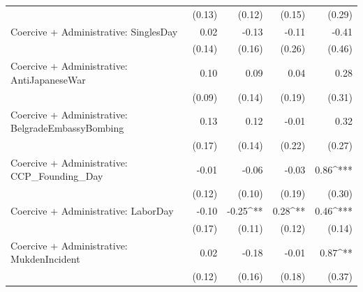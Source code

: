 \begin{table}
\begin{center}
\begin{tabular}{l D{.}{.}{6.5} D{.}{.}{6.5} D{.}{.}{6.5} D{.}{.}{6.5}}
                                                     & (0.13)                  & (0.12)                  & (0.15)                  & (0.29)                  \\
Coercive + Administrative: SinglesDay                & 0.02                    & -0.13                   & -0.11                   & -0.41                   \\
                                                     & (0.14)                  & (0.16)                  & (0.26)                  & (0.46)                  \\
Coercive + Administrative: AntiJapaneseWar           & 0.10                    & 0.09                    & 0.04                    & 0.28                    \\
                                                     & (0.09)                  & (0.14)                  & (0.19)                  & (0.31)                  \\
Coercive + Administrative: BelgradeEmbassyBombing    & 0.13                    & 0.12                    & -0.01                   & 0.32                    \\
                                                     & (0.17)                  & (0.14)                  & (0.22)                  & (0.27)                  \\
Coercive + Administrative: CCP\_Founding\_Day        & -0.01                   & -0.06                   & -0.03                   & 0.86^{***}              \\
                                                     & (0.12)                  & (0.10)                  & (0.19)                  & (0.30)                  \\
Coercive + Administrative: LaborDay                  & -0.10                   & -0.25^{**}              & 0.28^{**}               & 0.46^{***}              \\
                                                     & (0.17)                  & (0.11)                  & (0.12)                  & (0.14)                  \\
Coercive + Administrative: MukdenIncident            & 0.02                    & -0.18                   & -0.01                   & 0.87^{**}               \\
                                                     & (0.12)                  & (0.16)                  & (0.18)                  & (0.37)                  \\

\end{tabular}
\end{center}
\end{table}
